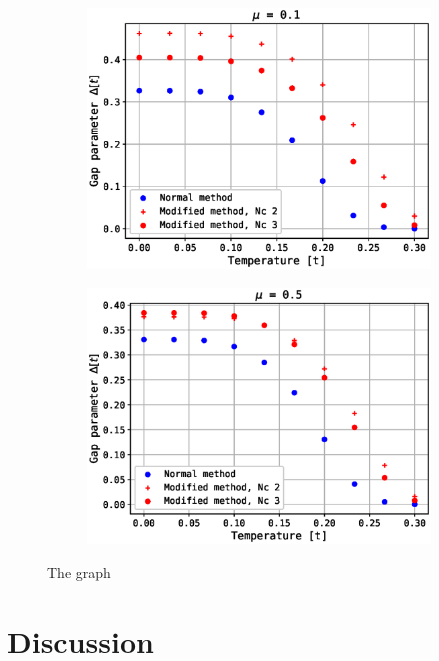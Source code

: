 \documentclass[11pt,twocolumn]{article}
\begin{document}
\begin{figure}[ht!]
	\centering
	\begin{subfigure}{0.5\textwidth}
	\begin{center}
		\includegraphics[width=\textwidth]{figures/deltacomp_N30_mu0.1.eps}
	\end{center}
	\end{subfigure}
	\begin{subfigure}{0.5\textwidth}
	\begin{center}
		\includegraphics[width=\textwidth]{figures/deltacomp_N30_mu0.5.eps}
	\end{center}
	\end{subfigure}
	\caption{The graph}
	\label{fig:thegraph}
\end{figure}

\section{Discussion}\label{sec:discussion}


\onecolumn
\end{document}
